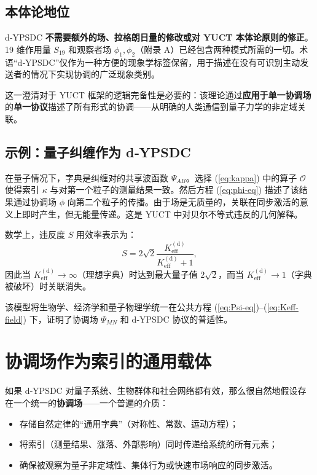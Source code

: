 \documentclass[11pt,a4paper]{article}
\newcommand{\Keff}{K_{\mathrm{eff}}}
\begin{document}
	\subsection{本体论地位}
	d‑YPSDC \textbf{不需要额外的场、拉格朗日量的修改或对 YUCT 本体论原则的修正}。19 维作用量 \(S_{19}\) 和观察者场 \(\phi_1,\phi_2\)（附录 A）已经包含两种模式所需的一切。术语“d‑YPSDC”仅作为一种方便的现象学标签保留，用于描述在没有可识别主动发送者的情况下实现协调的广泛现象类别。
	
	这一澄清对于 YUCT 框架的逻辑完备性是必要的：该理论通过\textbf{应用于单一协调场}的\textbf{单一协议}描述了所有形式的协调——从明确的人类通信到量子力学的非定域关联。
	
	\subsection{示例：量子纠缠作为 d‑YPSDC}
	
	在量子情况下，字典是纠缠对的共享波函数 \(\Psi_{AB}\)。选择 (\ref{eq:kappa}) 中的算子 \(\mathcal{O}\) 使得索引 \(\kappa\) 与对第一个粒子的测量结果一致。然后方程 (\ref{eq:phi-eq}) 描述了该结果通过协调场 \(\phi\) 向第二个粒子的传播。由于场是无质量的，关联在同步激活的意义上即时产生，但无能量传递。这是 YUCT 中对贝尔不等式违反的几何解释。
	
	数学上，违反度 \(S\) 用效率表示为：
	\begin{equation}
		S = 2\sqrt{2} \frac{\Keff^{\mathrm{(d)}}}{\Keff^{\mathrm{(d)}} + 1},
	\end{equation}
	因此当 \(\Keff^{\mathrm{(d)}} \to \infty\)（理想字典）时达到最大量子值 \(2\sqrt{2}\)，而当 \(\Keff^{\mathrm{(d)}} \to 1\)（字典被破坏）时关联消失。
	
	该模型将生物学、经济学和量子物理学统一在公共方程 (\ref{eq:Psi-eq})–(\ref{eq:Keff-field}) 下，证明了协调场 \(\Psi_{MN}\) 和 d‑YPSDC 协议的普适性。
	
	\section{协调场作为索引的通用载体}
	
	如果 d‑YPSDC 对量子系统、生物群体和社会网络都有效，那么很自然地假设存在一个统一的\textbf{协调场}——一个普遍的介质：
	
	\begin{itemize}
		\item 存储自然定律的“通用字典”（对称性、常数、运动方程）；
		\item 将索引（测量结果、涨落、外部影响）同时传递给系统的所有元素；
		\item 确保被观察为量子非定域性、集体行为或快速市场响应的同步激活。
	\end{itemize}
	
\end{document}

